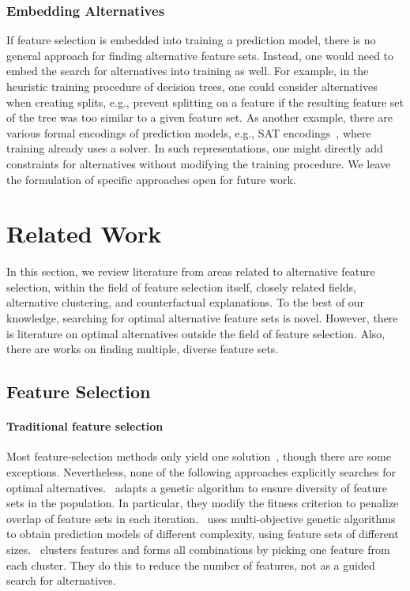 \documentclass{article}
\theoremstyle{definition}
\begin{document}
\subsubsection{Embedding Alternatives}
\label{sec:approach:objectives:embedding}

If feature selection is embedded into training a prediction model, there is no general approach for finding alternative feature sets.
Instead, one would need to embed the search for alternatives into training as well.
For example, in the heuristic training procedure of decision trees, one could consider alternatives when creating splits, e.g., prevent splitting on a feature if the resulting feature set of the tree was too similar to a given feature set.
As another example, there are various formal encodings of prediction models, e.g., SAT encodings~\cite{narodytska2018learning, schidler2021sat, yu2021learning}, where training already uses a solver.
In such representations, one might directly add constraints for alternatives without modifying the training procedure.
We leave the formulation of specific approaches open for future work.

\section{Related Work}
\label{sec:related-work}

In this section, we review literature from areas related to alternative feature selection, within the field of feature selection itself, closely related fields, alternative clustering, and counterfactual explanations.
To the best of our knowledge, searching for optimal alternative feature sets is novel.
However, there is literature on optimal alternatives outside the field of feature selection.
Also, there are works on finding multiple, diverse feature sets.

\subsection{Feature Selection}

\paragraph{Traditional feature selection}

Most feature-selection methods only yield one solution~\cite{borboudakis2021extending}, though there are some exceptions.
Nevertheless, none of the following approaches explicitly searches for optimal alternatives.
\cite{siddiqi2020genetic}~adapts a genetic algorithm to ensure diversity of feature sets in the population.
In particular, they modify the fitness criterion to penalize overlap of feature sets in each iteration.
\cite{emmanouilidis1999selecting}~uses multi-objective genetic algorithms to obtain prediction models of different complexity, using feature sets of different sizes.
\cite{mueller2021feature}~clusters features and forms all combinations by picking one feature from each cluster.
They do this to reduce the number of features, not as a guided search for alternatives.
\end{document}

